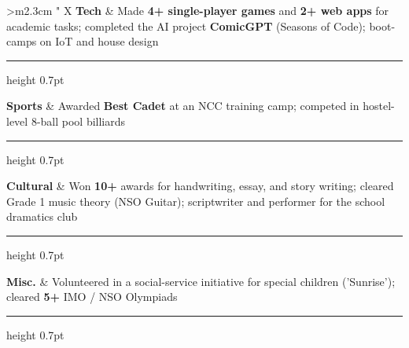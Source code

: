 \documentclass[10pt]{article}
\makeatletter
\newcommand{\thickhline}{%
    \noalign {\ifnum 0=`}\fi \hrule height 0.7pt
    \futurelet \reserved@a \@xhline
}
\newcommand{\xfill}[2][1ex]{
	\dimen0=#2\advance\dimen0 by #1
	\leaders\hrule height \dimen0 depth -#1\hfill
}
\renewcommand{\section}[1]{
	\vspace{4pt}
	{\color{RoyalBlue}{\Large\scshape\raggedright #1\xfill[0pt]{0.5pt}}}
}
\makeatother
\begin{document}
\section{Extracurricular Activities}
 
\vspace{3pt}
\begin{tabularx}{\textwidth}{>{\centering\arraybackslash}m{2.3cm} " X}
	\textbf{Tech} & Made \textbf{4+ single-player games} and \textbf{2+ web apps} for academic tasks; completed the AI project \textbf{ComicGPT} (Seasons of Code); boot-camps on IoT and house design \\ \thickhline
	\textbf{Sports} & Awarded \textbf{Best Cadet} at an NCC training camp; competed in hostel-level 8-ball pool billiards \\ \thickhline
	\textbf{Cultural} & Won \textbf{10+} awards for handwriting, essay, and story writing; cleared Grade 1 music theory (NSO Guitar); scriptwriter and performer for the school dramatics club \\ \thickhline
	\textbf{Misc.} & Volunteered in a social-service initiative for special children ('Sunrise'); cleared \textbf{5+} IMO / NSO Olympiads \\ \thickhline
\end{tabularx}
\end{document}
